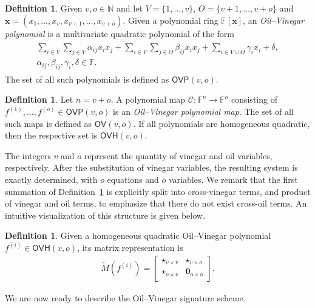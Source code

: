 \documentclass[12pt, a4paper, oneside]{memoir}
\theoremstyle{definition}
\newtheorem{definition}[theorem]{Definition}
\begin{document}
\begin{definition}\label{def:ovp}
  Given $v, o \in \mathbb{N}$ and let $V = \{1, \dots, v\}$, $O = \{v + 1, \dots, v + o\}$ and $\mathbf{x} = (x_{1}, \dots, x_{v}, x_{v + 1}, \dots, x_{v + o})$. Given a polynomial ring $\mathbb{F}[\mathbf{x}]$, an \emph{Oil--Vinegar polynomial} is a multivariate quadratic polynomial of the form
  \begin{align}
    \begin{split}
      \sum_{i \in V} \sum_{j \in V} \alpha_{ij} x_{i} x_{j}
        + \sum_{i \in V} \sum_{j \in O} \beta_{ij} x_{i} x_{j}
        + \sum_{i \in V \cup O} \gamma_{i} x_{i}
        + \delta, \\
      \alpha_{ij}, \beta_{ij}, \gamma_{i}, \delta \in \mathbb{F}.
    \end{split}
  \end{align}
  The set of all such polynomials is defined as $\mathsf{OVP}(v, o)$.
\end{definition}

\begin{definition}
  Let $n = v + o$. A polynomial map $\mathcal{C} : \mathbb{F}^{n} \to \mathbb{F}^{o}$ consisting of $f^{(1)}, \dots, f^{(o)} \in \mathsf{OVP}(v, o)$ is an \emph{Oil--Vinegar polynomial map}. The set of all such maps is defined as $\mathsf{OV}(v, o)$. If all polynomials are homogeneous quadratic, then the respective set is $\mathsf{OVH}(v, o)$.
\end{definition}

The integers $v$ and $o$ represent the quantity of vinegar and oil variables, respectively. After the substitution of vinegar variables, the resulting system is exactly determined, with $o$ equations and $o$ variables. We remark that the first summation of Definition~\ref{def:ovp} is explicitly split into cross-vinegar terms, and product of vinegar and oil terms, to emphasize that there do not exist cross-oil terms. An intuitive visualization of this structure is given below.

\begin{definition}
  Given a homogeneous quadratic Oil--Vinegar polynomial $f^{(i)} \in \mathsf{OVH}(v, o)$, its matrix representation is
  \begin{align}
    \widetilde{M}(f^{(i)}) =
    \begin{bmatrix}
      \star_{v \times v} & \star_{v \times o} \\
      \star_{o \times v} & \mathbf{0}_{o \times o} \\
    \end{bmatrix}.
  \end{align}
\end{definition}
We are now ready to describe the Oil--Vinegar signature scheme.
\end{document}
